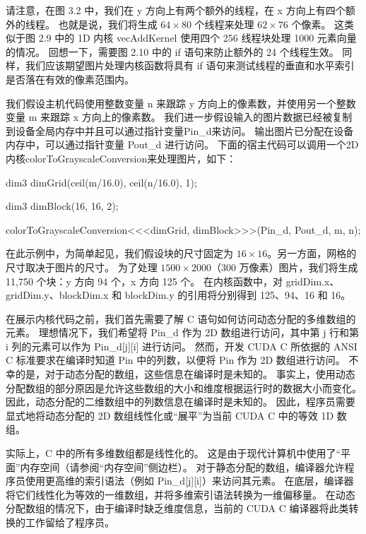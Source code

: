 请注意，在图 3.2 中，我们在 y 方向上有两个额外的线程，在 x 方向上有四个额外的线程。 
也就是说，我们将生成 $64 \times 80$ 个线程来处理 $62 \times 76$ 个像素。 
这类似于图 2.9 中的 1D 内核 vecAddKernel 使用四个 256 线程块处理 1000 元素向量的情况。 
回想一下，需要图 2.10 中的 if 语句来防止额外的 24 个线程生效。 
同样，我们应该期望图片处理内核函数将具有 if 语句来测试线程的垂直和水平索引是否落在有效的像素范围内。

我们假设主机代码使用整数变量 n 来跟踪 y 方向上的像素数，并使用另一个整数变量 m 来跟踪 x 方向上的像素数。 
我们进一步假设输入的图片数据已经被复制到设备全局内存中并且可以通过指针变量Pin\_d来访问。 
输出图片已分配在设备内存中，可以通过指针变量 Pout\_d 进行访问。 
下面的宿主代码可以调用一个2D内核colorToGrayscaleConversion来处理图片，如下：

dim3 dimGrid(ceil(m/16.0), ceil(n/16.0), 1);

dim3 dimBlock(16, 16, 2);

colorToGrayscaleConversion<<<dimGrid, dimBlock>>>(Pin\_d, Pout\_d, m, n);

在此示例中，为简单起见，我们假设块的尺寸固定为 $16 \times 16$。另一方面，网格的尺寸取决于图片的尺寸。 
为了处理 $1500 \times 2000$（300 万像素）图片，我们将生成 11,750 个块：y 方向 94 个，x 方向 125 个。 
在内核函数中，对 gridDim.x、gridDim.y、blockDim.x 和 blockDim.y 的引用将分别得到 125、94、16 和 16。

在展示内核代码之前，我们首先需要了解 C 语句如何访问动态分配的多维数组的元素。 
理想情况下，我们希望将 Pin\_d 作为 2D 数组进行访问，其中第 j 行和第 i 列的元素可以作为 Pin\_d[j][i] 进行访问。 
然而，开发 CUDA C 所依据的 ANSI C 标准要求在编译时知道 Pin 中的列数，以便将 Pin 作为 2D 数组进行访问。 
不幸的是，对于动态分配的数组，这些信息在编译时是未知的。 
事实上，使用动态分配数组的部分原因是允许这些数组的大小和维度根据运行时的数据大小而变化。 
因此，动态分配的二维数组中的列数信息在编译时是未知的。 
因此，程序员需要显式地将动态分配的 2D 数组线性化或“展平”为当前 CUDA C 中的等效 1D 数组。

实际上，C 中的所有多维数组都是线性化的。 这是由于现代计算机中使用了“平面”内存空间（请参阅“内存空间”侧边栏）。 
对于静态分配的数组，编译器允许程序员使用更高维的索引语法（例如 Pin\_d[j][i]）来访问其元素。 
在底层，编译器将它们线性化为等效的一维数组，并将多维索引语法转换为一维偏移量。 
在动态分配数组的情况下，由于编译时缺乏维度信息，当前的 CUDA C 编译器将此类转换的工作留给了程序员。

